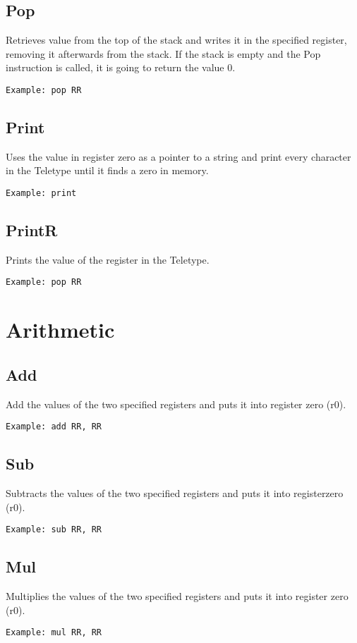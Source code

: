 \documentclass[oneside]{book}
\begin{document}
 \subsection{Pop}
Retrieves value from the top of the stack and writes it in the specified register, removing it afterwards from the stack. If the stack is empty and the Pop instruction is called, it is going to return the value 0.
\begin{Verbatim}
Example: pop RR
\end{Verbatim}

 \subsection{Print}
Uses the value in register zero as a pointer to a string and print every character in the Teletype until it finds a zero in memory. 
\begin{Verbatim}
Example: print
\end{Verbatim}

 \subsection{PrintR}
Prints the value of the register in the Teletype.
\begin{Verbatim}
Example: pop RR
\end{Verbatim}

  \section{Arithmetic}

 \subsection{Add}
Add the values of the two specified registers and puts it into register zero (r0).
\begin{Verbatim}
Example: add RR, RR
\end{Verbatim}

 \subsection{Sub}
Subtracts the values of the two specified registers and puts it into registerzero (r0).
\begin{Verbatim}
Example: sub RR, RR
\end{Verbatim}

 \subsection{Mul}
Multiplies the values of the two specified registers and puts it into register zero (r0).
\begin{Verbatim}
Example: mul RR, RR
\end{Verbatim}
\end{document}
